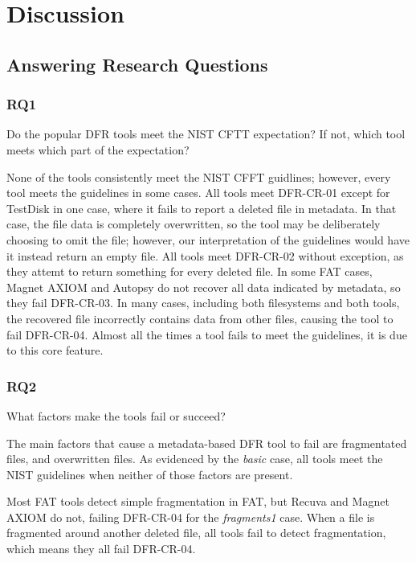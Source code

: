 \section{Discussion}

\subsection{Answering Research Questions}

\subsubsection{RQ1}
\begin{paraphrase}
Do the popular DFR tools meet the NIST CFTT expectation? 
If not, which tool meets which part of the expectation? 
\end{paraphrase}

None of the tools consistently meet the NIST CFFT guidlines; however, every tool meets the guidelines in some cases.
All tools meet DFR-CR-01 except for TestDisk in one case, where it fails to report a deleted file in metadata.
In that case, the file data is completely overwritten, so the tool may be deliberately choosing to omit the file; however, our interpretation of the guidelines would have it instead return an empty file.
All tools meet DFR-CR-02 without exception, as they attemt to return something for every deleted file.
In some FAT cases, Magnet AXIOM and Autopsy do not recover all data indicated by metadata, so they fail DFR-CR-03.
In many cases, including both filesystems and both tools, the recovered file incorrectly contains data from other files, causing the tool to fail DFR-CR-04.
Almost all the times a tool fails to meet the guidelines, it is due to this core feature.

\begin{paraphrase}
\subsubsection{RQ2}
What factors make the tools fail or succeed?
\end{paraphrase}

The main factors that cause a metadata-based DFR tool to fail are fragmentated files, and overwritten files.
As evidenced by the \emph{basic} case, all tools meet the NIST guidelines when neither of those factors are present.

Most FAT tools detect simple fragmentation in FAT, but Recuva and Magnet AXIOM do not, failing DFR-CR-04 for the \emph{fragments1} case.
When a file is fragmented around another deleted file, all tools fail to detect fragmentation, which means they all fail DFR-CR-04.

